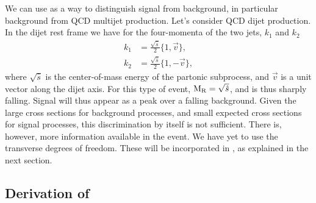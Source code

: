 We can use \mr as a way to distinguish signal from background, in particular background from QCD
multijet production. Let's consider QCD dijet production. In the dijet rest frame we have for the
four-momenta of the two jets, $k_1$ and $k_2$
\begin{align}
  k_1 &= \frac{\sqrt{\hat{s}}}{2} \{1, \vec{v}\} ,\\
  k_2 &= \frac{\sqrt{\hat{s}}}{2} \{1, -\vec{v}\},
\end{align}
where $\sqrt{\hat{s}}$ is the center-of-mass energy of the partonic subprocess, and $\vec{v}$ is a
unit vector along the dijet axis. For this type of event, $\mathrm{M_R} = \sqrt{\hat{s}}$, and is thus
sharply falling. Signal will thus appear as a peak over a falling background. Given the large cross
sections for background processes, and small expected cross sections for signal processes, this
discrimination by itself is not sufficient. There is, however, more information available in the
event. We have yet to use the transverse degrees of freedom. These will be incorporated in \rsq, as
explained in the next section. 

\subsection{Derivation of \texorpdfstring{\rsq}{R2} \label{sec:razor_r2}}

